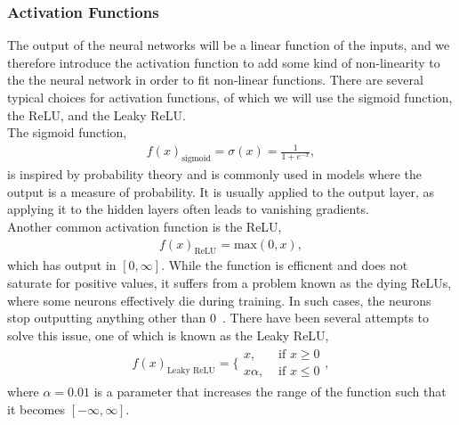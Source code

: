 \documentclass[english,notitlepage,reprint,nofootinbib]{revtex4-2}  %
\begin{document}
\subsubsection*{Activation Functions}%
The output of the neural networks will be a linear function of the inputs, and we therefore introduce the activation function to add some kind of non-linearity to the the neural network in order to fit non-linear functions. 
There are several typical choices for activation functions, of which we will use the sigmoid function, the ReLU, and the Leaky ReLU. 
\vspace{3mm}
\\ 
The sigmoid function, 
\begin{align}
    f(x)_\text{sigmoid} = \sigma(x) = \frac{1}{1+e^{−x}},
\end{align}
is inspired by probability theory and is commonly used in models where the output is a measure of probability. It is usually applied to the output layer, as applying it to the hidden layers often leads to vanishing gradients. 
\vspace{3mm}
\\ 
Another common activation function is the ReLU, 
\begin{align}
    f(x)_\text{ReLU} = \text{max}(0, x), 
\end{align}
which has output in $[0,\infty]$. 
While the function is efficnent and does not saturate for positive values, it suffers from a problem known as the dying ReLUs, where some neurons effectively die during training. In such cases, the neurons stop outputting anything other than 0~\cite{lecture_notes}. There have been several attempts to solve this issue, one of which is known as the Leaky ReLU, 
\begin{align}
    f(x)_\text{Leaky ReLU} = \bigg\{ 
    \begin{matrix}
        x,       & \text{ if } x \geq 0 \\ 
        x\alpha, & \text{ if } x \leq 0 
    \end{matrix}, 
\end{align}
where $\alpha=0.01$ is a parameter that increases the range of the function such that it becomes $[-\infty, \infty]$. 
\end{document}
